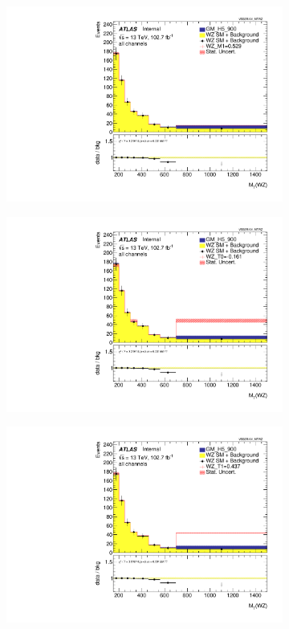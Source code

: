 \documentclass[../Bachelorarbeit.tex]{subfiles}
\begin{document}
\begin{figure}[h]
\begin{subfigure}{0.45\textwidth}
        \includegraphics[width=\textwidth]{Plots/ALL_MTWZ_right_color/GM_H5_900/M1/2022-05-07/VBSSR/all_VV_MTWZ.pdf}
    \end{subfigure}
    \begin{subfigure}{0.45\textwidth}
        \includegraphics[width=\textwidth]{Plots/ALL_MTWZ_right_color/GM_H5_900/T0/2022-05-07/VBSSR/all_VV_MTWZ.pdf}
    \end{subfigure}
    \begin{subfigure}{0.45\textwidth}
        \includegraphics[width=\textwidth]{Plots/ALL_MTWZ_right_color/GM_H5_900/T1/2022-05-07/VBSSR/all_VV_MTWZ.pdf}

\end{subfigure}
\end{figure}
\end{document}
